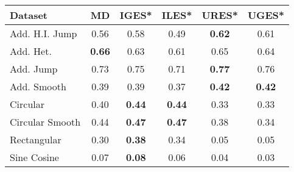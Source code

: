 \begin{tabular}{lccccc}
\toprule
Dataset & MD & IGES* & ILES* & URES* & UGES* \\
\midrule
Add. H.I. Jump & 0.56 & 0.58 & 0.49 & \textbf{0.62} & 0.61 \\
Add. Het. & \textbf{0.66} & 0.63 & 0.61 & 0.65 & 0.64 \\
Add. Jump & 0.73 & 0.75 & 0.71 & \textbf{0.77} & 0.76 \\
Add. Smooth & 0.39 & 0.39 & 0.37 & \textbf{0.42} & \textbf{0.42} \\
Circular & 0.40 & \textbf{0.44} & \textbf{0.44} & 0.33 & 0.33 \\
Circular Smooth & 0.44 & \textbf{0.47} & \textbf{0.47} & 0.38 & 0.34 \\
Rectangular & 0.30 & \textbf{0.38} & 0.34 & 0.05 & 0.05 \\
Sine Cosine & 0.07 & \textbf{0.08} & 0.06 & 0.04 & 0.03 \\
\bottomrule
\end{tabular}